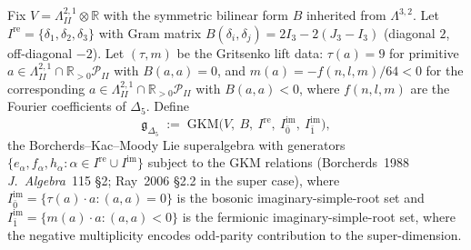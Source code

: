 \begin{definition}
\label{def:qgf-gDelta5-gkm-datum}
Fix $V = \Lambda^{2,1}_{II}\otimes\mathbb{R}$ with the symmetric
bilinear form $B$ inherited from $\Lambda^{3,2}$. Let
$I^{\mathrm{re}} = \{\delta_1, \delta_2, \delta_3\}$ with
Gram matrix $B(\delta_i,\delta_j) = 2I_3 - 2(J_3 - I_3)$
(diagonal $2$, off-diagonal $-2$). Let $(\tau,m)$ be the Gritsenko
lift data: $\tau(a) = 9$ for primitive $a \in \Lambda^{2,1}_{II}\cap
\mathbb{R}_{>0}\mathcal{P}_{II}$ with $B(a,a)=0$, and
$m(a) = -f(n,l,m)/64 < 0$ for the corresponding
$a \in \Lambda^{2,1}_{II}\cap\mathbb{R}_{>0}\mathcal{P}_{II}$ with
$B(a,a)<0$, where $f(n,l,m)$ are the Fourier coefficients of
$\Delta_5$.
Define
\[
 \mathfrak g_{\Delta_5} \;:=\; \mathrm{GKM}\bigl(V,\ B,\
 I^{\mathrm{re}},\ I^{\mathrm{im}}_{\bar 0},\ I^{\mathrm{im}}_{\bar 1}\bigr),
\]
the Borcherds--Kac--Moody Lie superalgebra with generators
$\{e_\alpha, f_\alpha, h_\alpha : \alpha \in I^{\mathrm{re}}\cup
I^{\mathrm{im}}\}$ subject to the GKM relations
(Borcherds~1988 \emph{J.~Algebra}~115 \S2; Ray~2006 \S2.2 in the
super case), where $I^{\mathrm{im}}_{\bar 0} = \{\tau(a)\cdot a :
(a,a)=0\}$ is the bosonic imaginary-simple-root set and
$I^{\mathrm{im}}_{\bar 1} = \{m(a)\cdot a : (a,a)<0\}$ is the
fermionic imaginary-simple-root set, where the negative multiplicity
encodes odd-parity contribution to the super-dimension.
\end{definition}

